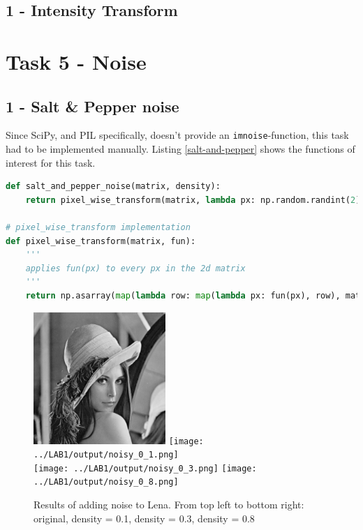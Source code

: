 \subsection*{1 - Intensity Transform}



\section*{Task 5 - Noise}

\subsection*{1 - Salt \& Pepper noise}

Since SciPy, and PIL specifically, doesn't provide an \texttt{imnoise}-function, this task had to be implemented manually. Listing \ref{salt-and-pepper} shows the functions of interest for this task.

\begin{lstlisting}[language=Python, label=salt-and-pepper, caption=Salt \& pepper noise]
def salt_and_pepper_noise(matrix, density):
    return pixel_wise_transform(matrix, lambda px: np.random.randint(2) if np.random.random() < density else px)

# pixel_wise_transform implementation
def pixel_wise_transform(matrix, fun):
    '''
    applies fun(px) to every px in the 2d matrix
    '''
    return np.asarray(map(lambda row: map(lambda px: fun(px), row), matrix))
\end{lstlisting}


\begin{figure}[h!]
    \centering
    \includegraphics[width=5cm]{../LAB1/img/lena.png}
    \texttt{[image: ../LAB1/output/noisy\_0\_1.png]} \\
    \texttt{[image: ../LAB1/output/noisy\_0\_3.png]}
    \texttt{[image: ../LAB1/output/noisy\_0\_8.png]}
    \caption{Results of adding noise to Lena. From top left to bottom right: original, density = 0.1, density = 0.3, density = 0.8}
\end{figure}

